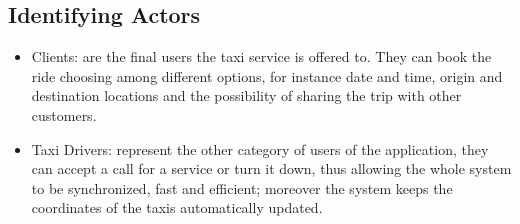 \documentclass[a4paper,11pt]{report} %
\begin{document}
	\subsection{Identifying Actors}
		\begin{itemize}
			\item Clients: are the final users the taxi service is offered to. They can book the ride choosing among different options, for instance date and time, origin and destination locations and the possibility of sharing the trip with other customers.
			\item Taxi Drivers: represent the other category of users of the application, they can accept a call for a service or turn it down, thus allowing the whole system to be synchronized, fast and efficient; moreover the system keeps the coordinates of the taxis automatically updated.
		\end{itemize}
	
\end{document}
